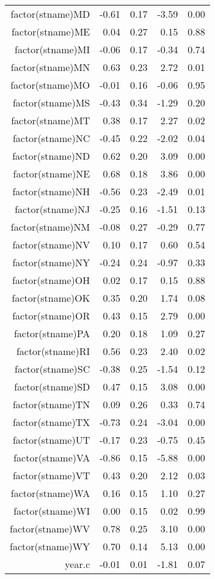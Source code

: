 \begin{table}[ht]
\begin{tabular}{rrrrr}
  factor(stname)MD & -0.61 & 0.17 & -3.59 & 0.00 \\ 
  factor(stname)ME & 0.04 & 0.27 & 0.15 & 0.88 \\ 
  factor(stname)MI & -0.06 & 0.17 & -0.34 & 0.74 \\ 
  factor(stname)MN & 0.63 & 0.23 & 2.72 & 0.01 \\ 
  factor(stname)MO & -0.01 & 0.16 & -0.06 & 0.95 \\ 
  factor(stname)MS & -0.43 & 0.34 & -1.29 & 0.20 \\ 
  factor(stname)MT & 0.38 & 0.17 & 2.27 & 0.02 \\ 
  factor(stname)NC & -0.45 & 0.22 & -2.02 & 0.04 \\ 
  factor(stname)ND & 0.62 & 0.20 & 3.09 & 0.00 \\ 
  factor(stname)NE & 0.68 & 0.18 & 3.86 & 0.00 \\ 
  factor(stname)NH & -0.56 & 0.23 & -2.49 & 0.01 \\ 
  factor(stname)NJ & -0.25 & 0.16 & -1.51 & 0.13 \\ 
  factor(stname)NM & -0.08 & 0.27 & -0.29 & 0.77 \\ 
  factor(stname)NV & 0.10 & 0.17 & 0.60 & 0.54 \\ 
  factor(stname)NY & -0.24 & 0.24 & -0.97 & 0.33 \\ 
  factor(stname)OH & 0.02 & 0.17 & 0.15 & 0.88 \\ 
  factor(stname)OK & 0.35 & 0.20 & 1.74 & 0.08 \\ 
  factor(stname)OR & 0.43 & 0.15 & 2.79 & 0.00 \\ 
  factor(stname)PA & 0.20 & 0.18 & 1.09 & 0.27 \\ 
  factor(stname)RI & 0.56 & 0.23 & 2.40 & 0.02 \\ 
  factor(stname)SC & -0.38 & 0.25 & -1.54 & 0.12 \\ 
  factor(stname)SD & 0.47 & 0.15 & 3.08 & 0.00 \\ 
  factor(stname)TN & 0.09 & 0.26 & 0.33 & 0.74 \\ 
  factor(stname)TX & -0.73 & 0.24 & -3.04 & 0.00 \\ 
  factor(stname)UT & -0.17 & 0.23 & -0.75 & 0.45 \\ 
  factor(stname)VA & -0.86 & 0.15 & -5.88 & 0.00 \\ 
  factor(stname)VT & 0.43 & 0.20 & 2.12 & 0.03 \\ 
  factor(stname)WA & 0.16 & 0.15 & 1.10 & 0.27 \\ 
  factor(stname)WI & 0.00 & 0.15 & 0.02 & 0.99 \\ 
  factor(stname)WV & 0.78 & 0.25 & 3.10 & 0.00 \\ 
  factor(stname)WY & 0.70 & 0.14 & 5.13 & 0.00 \\ 
  year.c & -0.01 & 0.01 & -1.81 & 0.07 \\ 
   \hline
\end{tabular}
\end{table}
